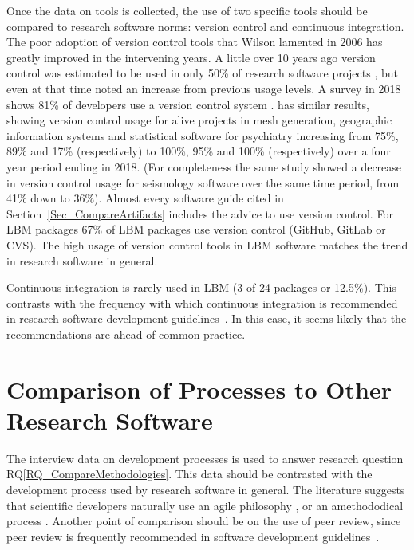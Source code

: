 \documentclass[runningheads]{llncs}
\newcommand{\rqref}[1]{RQ\ref{#1}}
\begin{document}
Once the data on tools is collected, the use of two specific tools should be
compared to research software norms: version control and continuous integration.
The poor adoption of version control tools that Wilson lamented in 2006
\cite{Wilson2006} has greatly improved in the intervening years.  A little over
10 years ago version control was estimated to be used in only 50\% of research
software projects \cite{Nguyen-HoanEtAl2010}, but even at that time
\cite{Nguyen-HoanEtAl2010} noted an increase from previous usage levels. A
survey in 2018 shows 81\% of developers use a version control system
\cite{AlNoamanyAndBorghi2018}.  \cite{Smith2018} has similar results, showing
version control usage for alive projects in mesh generation, geographic
information systems and statistical software for psychiatry increasing from
75\%, 89\% and 17\% (respectively) to 100\%, 95\% and 100\% (respectively) over
a four year period ending in 2018.  (For completeness the same study showed a
decrease in version control usage for seismology software over the same time
period, from 41\% down to 36\%).  Almost every software guide cited in
Section~\ref{Sec_CompareArtifacts} includes the advice to use version control.
For LBM packages 67\% of LBM packages use version control (GitHub, GitLab or
CVS). The high usage of version control tools in LBM software matches the trend
in research software in general.

Continuous integration is rarely used in LBM (3 of 24 packages or 12.5\%). This
contrasts with the frequency with which continuous integration is recommended in
research software development
guidelines~\cite{BrettEtAl2021,vanGompelEtAl2016,ThielEtAl2020}. In this case,
it seems likely that the recommendations are ahead of common practice.

\section{Comparison of Processes to Other Research Software} \label{Sec_CompareMethodologies}

The interview data on development processes is used to answer research question
\rqref{RQ_CompareMethodologies}.  This data should be contrasted with the
development process used by research software in general. The literature
suggests that scientific developers naturally use an agile philosophy
\cite{CarverEtAl2007,Segal2005}, or an amethododical process \cite{Kelly2013}.
Another point of comparison should be on the use of peer review, since peer
review is frequently recommended in software development
guidelines~\cite{HerouxEtAl2008,OrvizEtAl2017,USGS2019}.
\end{document}
